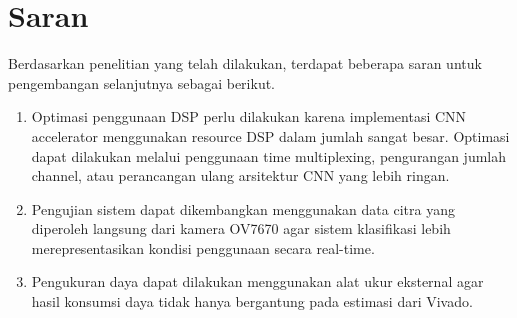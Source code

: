 \section{Saran}
Berdasarkan penelitian yang telah dilakukan, terdapat beberapa saran untuk pengembangan selanjutnya sebagai berikut.

\begin{enumerate}
    \item Optimasi penggunaan DSP perlu dilakukan karena implementasi CNN accelerator menggunakan resource DSP dalam jumlah sangat besar. Optimasi dapat dilakukan melalui penggunaan time multiplexing, pengurangan jumlah channel, atau perancangan ulang arsitektur CNN yang lebih ringan.

    \item Pengujian sistem dapat dikembangkan menggunakan data citra yang diperoleh langsung dari kamera OV7670 agar sistem klasifikasi lebih merepresentasikan kondisi penggunaan secara real-time.

    \item Pengukuran daya dapat dilakukan menggunakan alat ukur eksternal agar hasil konsumsi daya tidak hanya bergantung pada estimasi dari Vivado.

\end{enumerate}
